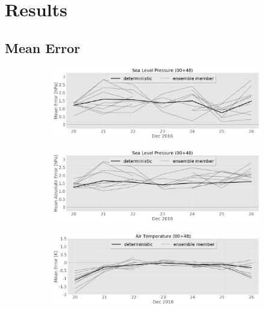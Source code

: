 \chapter{Results}
\section{Mean Error}%
\label{app:mean_error}

\begin{figure}[h]%
		\centering
		\begin{subfigure}[b]{0.49\textwidth}
			\includegraphics[width=\textwidth]{./fig_sfc_pressure/ME_20161220_26_00}
			\caption{}\label{fig:bias:pres}
		\end{subfigure}
        \begin{subfigure}[b]{0.49\textwidth}
			\includegraphics[width=\textwidth]{./fig_sfc_pressure/MAE_20161220_26_00}
			\caption{}\label{fig:MAE:pres}
		\end{subfigure}
		\begin{subfigure}[b]{0.49\textwidth}
			\includegraphics[width=\textwidth]{./fig_sfc_temp/ME_20161220_26_00}

\end{subfigure}
\end{figure}
